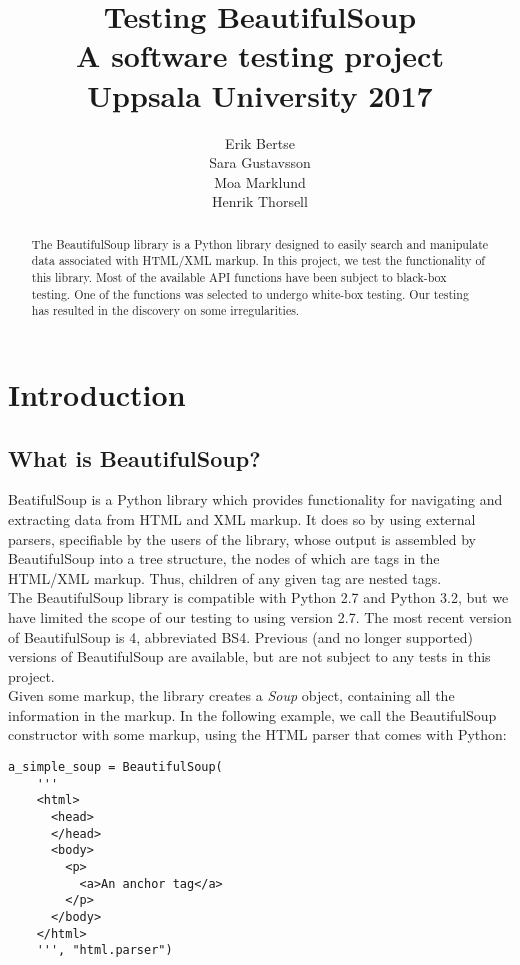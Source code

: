 \documentclass[10pt]{article}
\title{Testing BeautifulSoup \\ \small A software testing project \\ Uppsala University 2017}
\author{Erik Bertse \\ Sara Gustavsson \\ Moa Marklund \\ Henrik Thorsell}
\date{}
\begin{document}
\maketitle

\begin{abstract}
  The BeautifulSoup library is a Python library designed to easily search and manipulate data associated with HTML/XML markup. In this project, we test the functionality of this library. Most of the available API functions have been subject to black-box testing. One of the functions was selected to undergo white-box testing. Our testing has resulted in the discovery on some irregularities.
\end{abstract}

\section{Introduction}

\subsection{What is BeautifulSoup?}
 BeatifulSoup is a Python library which provides functionality for navigating and extracting data from HTML and XML markup. It does so by using external parsers, specifiable by the users of the library, whose output is assembled by BeautifulSoup into a tree structure, the nodes of which are tags in the HTML/XML markup. Thus, children of any given tag are nested tags. \\

 The BeautifulSoup library is compatible with Python 2.7 and Python 3.2, but we have limited the scope of our testing to using version 2.7. The most recent version of BeautifulSoup is 4, abbreviated BS4. Previous (and no longer supported) versions of BeautifulSoup are available, but are not subject to any tests in this project.  \\

Given some markup, the library creates a \textit{Soup} object, containing all the information in the markup. In the following example, we call the BeautifulSoup constructor with some markup, using the HTML parser that comes with Python: 
\newpage

\begin{lstlisting}[style = pythonstyle]
a_simple_soup = BeautifulSoup(
    '''
    <html>
      <head>
      </head>
      <body>
        <p>
          <a>An anchor tag</a>
        </p>
      </body>
    </html>
    ''', "html.parser")
\end{lstlisting}
\end{document}
